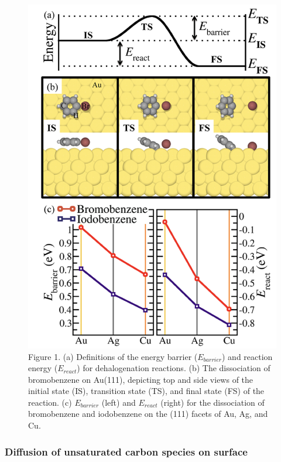 \documentclass[%
 reprint,
 amsmath,amssymb,
 aps,
prb,
]{revtex4-2}
\begin{document}
\begin{figure}[tbh]
\centering
\includegraphics[width=0.75\columnwidth]{Fig/dehalogentaion.png}
\caption{Figure 1. (a) Definitions of the energy barrier ($E_{barrier}$) and reaction energy ($E_{react}$) for dehalogenation reactions. (b) The dissociation of bromobenzene on Au(111), depicting top and side views of the initial state (IS), transition state (TS), and final state (FS) of the reaction. (c) $E_{barrier}$ (left) and $E_{react}$ (right) for the dissociation of bromobenzene and iodobenzene on the (111) facets of Au, Ag, and Cu.} 
\label{fig:dehalo}
\end{figure}

\subsubsection{Diffusion of unsaturated carbon species on surface}
\end{document}
